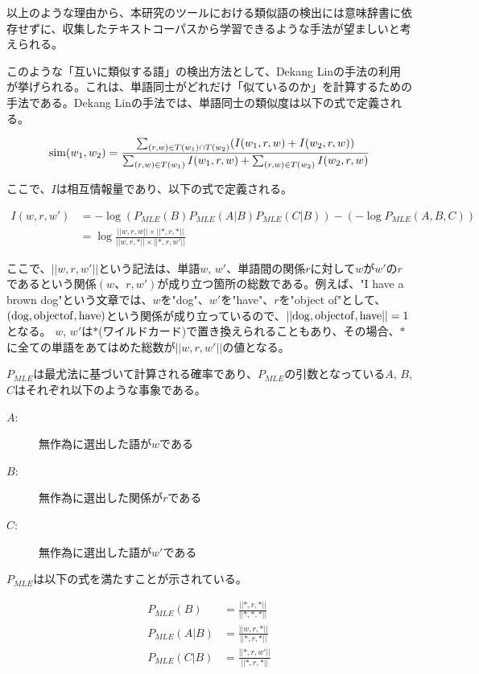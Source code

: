 \documentclass[12pt]{jarticle}
\begin{document}
以上のような理由から、本研究のツールにおける類似語の検出には意味辞書に依存せずに、収集したテキストコーパスから学習できるような手法が望ましいと考えられる。

このような「互いに類似する語」の検出方法として、Dekang Linの手法\cite{DekangLin}の利用が挙げられる。これは、単語同士がどれだけ「似ているのか」を計算するための手法である。Dekang Linの手法では、単語同士の類似度は以下の式で定義される。

\begin{equation}
  {\rm sim}(w_1, w_2) = \frac{\sum_{(r,w)\in T(w_1)\cap T(w_2)} (I(w_1, r, w) + I(w_2, r, w))}{\sum_{(r,w) \in T(w_1)}I(w_1, r, w) + \sum_{(r,w) \in T(w_2)}I(w_2, r, w)}
\end{equation}

ここで、$I$は相互情報量であり、以下の式で定義される。

\begin{align}
I(w, r, w') & = -\log(P_{MLE}(B)P_{MLE}(A|B)P_{MLE}(C|B))-(-\log P_{MLE}(A,B,C)) \\
 & = \log \frac{||w,r,w||\times||*,r,*||}{||w,r,*||\times||*,r,w'||}
\end{align}

ここで、$||w, r, w'||$という記法は、単語$w$, $w'$、単語間の関係$r$に対して$w$が$w'$の$r$であるという関係$(w、r, w')$が成り立つ箇所の総数である。例えば、"I have a brown dog"という文章では、$w$を"dog"、$w'$を"have"、$r$を"object of"として、$\rm (dog, objectof, have)$という関係が成り立っているので、$\rm||dog, object of, have||=1$となる。
$w$, $w'$は$*$(ワイルドカード)で置き換えられることもあり、その場合、$*$に全ての単語をあてはめた総数が$||w, r, w'||$の値となる。

$P_{MLE}$は最尤法に基づいて計算される確率であり、$P_{MLE}$の引数となっている$A$, $B$, $C$はそれぞれ以下のような事象である。

\begin{description}
  \item[$A$:]無作為に選出した語が$w$である
  \item[$B$:]無作為に選出した関係が$r$である
  \item[$C$:]無作為に選出した語が$w'$である
\end{description}

$P_{MLE}$は以下の式を満たすことが示されている。

\begin{align}
  P_{MLE}(B)   & = \frac{||*, r, *||}{||*, *, *||}\\
  P_{MLE}(A|B) & = \frac{||w, r, *||}{||*, r, *||}\\
  P_{MLE}(C|B) & = \frac{||*, r,w'||}{||*, r, *||}
\end{align}
\end{document}
